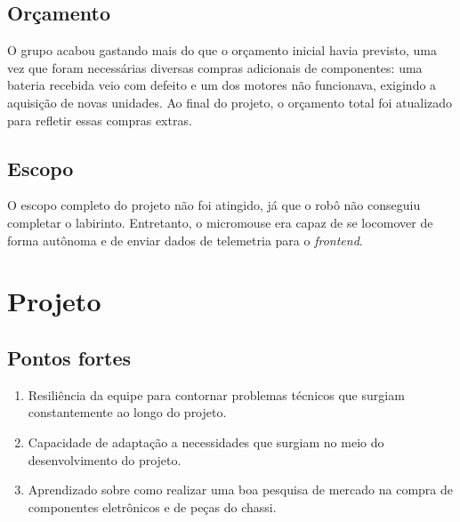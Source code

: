 \subsection{Orçamento}

O grupo acabou gastando mais do que o orçamento inicial havia previsto, uma vez que foram necessárias diversas compras adicionais de componentes: uma bateria recebida veio com defeito e um dos motores não funcionava, exigindo a aquisição de novas unidades. Ao final do projeto, o orçamento total foi atualizado para refletir essas compras extras.

\subsection{Escopo}

O escopo completo do projeto não foi atingido, já que o robô não conseguiu completar o labirinto. Entretanto, o micromouse era capaz de se locomover de forma autônoma e de enviar dados de telemetria para o \textit{frontend}.


\section{Projeto}
\subsection{Pontos fortes}
\begin{enumerate}
	\item Resiliência da equipe para contornar problemas técnicos que surgiam constantemente ao longo do projeto.
	\item Capacidade de adaptação a necessidades que surgiam no meio do desenvolvimento do projeto.
	\item Aprendizado sobre como realizar uma boa pesquisa de mercado na compra de componentes eletrônicos e de peças do chassi.
\end{enumerate}
